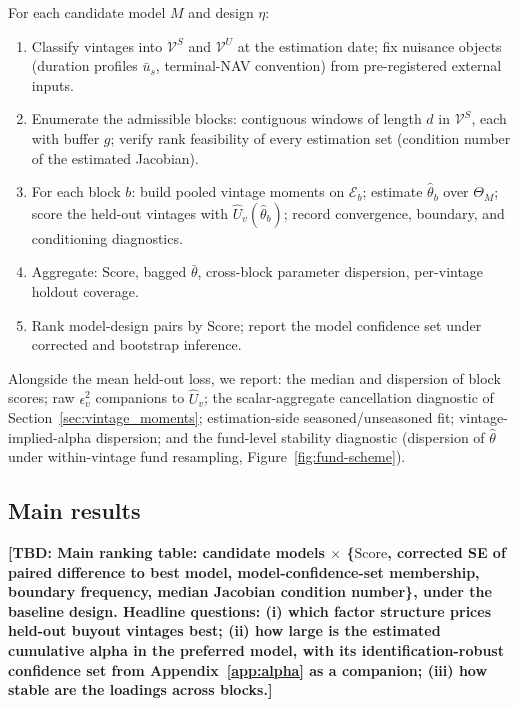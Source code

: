 \documentclass[11pt]{article}
\newcommand{\tbd}[1]{\textbf{[TBD: #1]}}
\begin{document}
For each candidate model \(M\) and design \(\eta\):
\begin{enumerate}
\item Classify vintages into \(\mathcal V^S\) and \(\mathcal V^U\) at the estimation date; fix nuisance objects (duration profiles \(\bar u_s\), terminal-NAV convention) from pre-registered external inputs.
\item Enumerate the admissible blocks: contiguous windows of length \(d\) in \(\mathcal V^S\), each with buffer \(g\); verify rank feasibility of every estimation set (condition number of the estimated Jacobian).
\item For each block \(b\): build pooled vintage moments on \(\mathcal E_b\); estimate \(\hat\theta_b\) over \(\Theta_M\); score the held-out vintages with \(\widehat U_v(\hat\theta_b)\); record convergence, boundary, and conditioning diagnostics.
\item Aggregate: \(\mathrm{Score}\), bagged \(\bar\theta\), cross-block parameter dispersion, per-vintage holdout coverage.
\item Rank model-design pairs by \(\mathrm{Score}\); report the model confidence set under corrected and bootstrap inference.
\end{enumerate}

Alongside the mean held-out loss, we report: the median and dispersion of block scores; raw \(\epsilon_v^2\) companions to \(\widehat U_v\); the scalar-aggregate cancellation diagnostic of Section~\ref{sec:vintage_moments}; estimation-side seasoned/unseasoned fit; vintage-implied-alpha dispersion; and the fund-level stability diagnostic (dispersion of \(\hat\theta\) under within-vintage fund resampling, Figure~\ref{fig:fund-scheme}).

\subsection{Main results}

\tbd{Main ranking table: candidate models \(\times\) \{\(\mathrm{Score}\), corrected SE of paired difference to best model, model-confidence-set membership, boundary frequency, median Jacobian condition number\}, under the baseline design. Headline questions: (i) which factor structure prices held-out buyout vintages best; (ii) how large is the estimated cumulative alpha in the preferred model, with its identification-robust confidence set from Appendix~\ref{app:alpha} as a companion; (iii) how stable are the loadings across blocks.}
\end{document}
